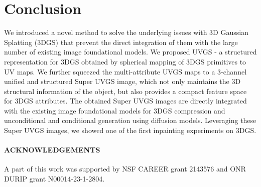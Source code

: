 \vspace{-0.2cm}
\section{Conclusion}
\vspace{-0.2cm}
We introduced a novel method to solve the underlying issues with 3D Gaussian Splatting (3DGS) that prevent the direct integration of them with the large number of existing image foundational models.
We proposed UVGS - a structured representation for 3DGS obtained by spherical mapping of 3DGS primitives to UV maps. We further squeezed the multi-attribute UVGS maps to a 3-channel unified and structured Super UVGS image, which not only maintains the 3D structural information of the object, but also provides a compact feature space for 3DGS attributes. The obtained Super UVGS images are directly integrated with the existing image foundational models for 3DGS compression and unconditional and conditional generation using diffusion models. Leveraging these Super UVGS images, we showed one of the first inpainting experiments on 3DGS.

\vspace{-0.4cm}
\paragraph{ACKNOWLEDGEMENTS}
 A part of this work was supported by NSF CAREER grant 2143576 and ONR DURIP grant N00014-23-1-2804.